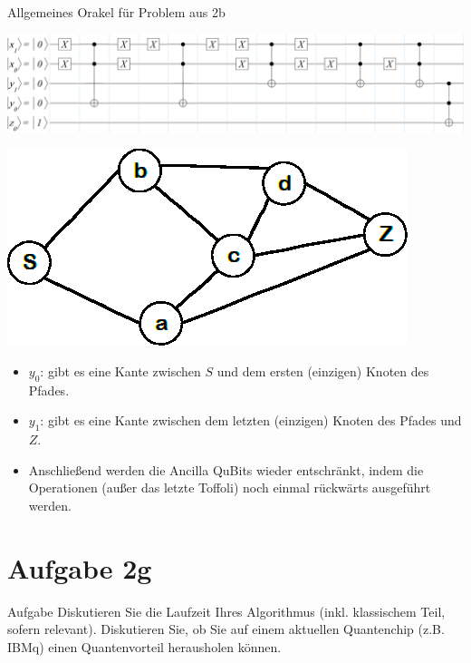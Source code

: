 \documentclass[fleqn,compress,utf8,aspectratio=169,t]{beamer}
\begin{document}
\begin{frame}{Allgemeines Orakel für Problem aus 2b}
\begin{minipage}{.75\textwidth}
	\includegraphics[width=.95\textwidth]{images/2f.png}
\end{minipage}%
\begin{minipage}{.25\textwidth}
	\includegraphics[width=.95\textwidth]{images/2-graph.png}
\end{minipage}
\begin{itemize}
	\item $y_0$: gibt es eine Kante zwischen $S$ und dem ersten (einzigen) Knoten des Pfades.
	\item $y_1$: gibt es eine Kante zwischen dem letzten (einzigen) Knoten des Pfades und $Z$.
	\item Anschließend werden die Ancilla QuBits wieder entschränkt, indem die Operationen (außer das letzte Toffoli) noch einmal rückwärts ausgeführt werden.
\end{itemize}
\end{frame}

\section{Aufgabe 2g}

\begin{frame}{Aufgabe}
Diskutieren Sie die Laufzeit Ihres Algorithmus (inkl. klassischem Teil, sofern relevant). Diskutieren Sie, ob Sie auf einem aktuellen Quantenchip (z.B. IBMq) einen Quantenvorteil herausholen können.
\end{frame}
\end{document}
